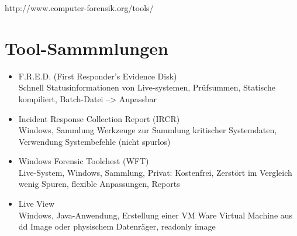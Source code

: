 http://www.computer-forensik.org/tools/



\section{Tool-Sammmlungen}
\begin{itemize}
\item F.R.E.D. (First Responder's Evidence Disk)\\
Schnell Statusinformationen von Live-systemen, Prüfsummen, Statische kompiliert, Batch-Datei --> Anpassbar
\item Incident Response Collection Report (IRCR)\\
Windows, Sammlung Werkzeuge zur Sammlung kritischer Systemdaten, Verwendung Systembefehle (nicht spurlos)
\item Windows Forensic Toolchest (WFT)\\
Live-System, Windows, Sammlung, Privat: Kostenfrei, Zerstört im Vergleich wenig Spuren, flexible Anpassungen, Reports
\item Live View\\
Windows, Java-Anwendung, Erstellung einer VM Ware Virtual Machine aus dd Image oder physischem Datenräger, readonly image
\end{itemize}

